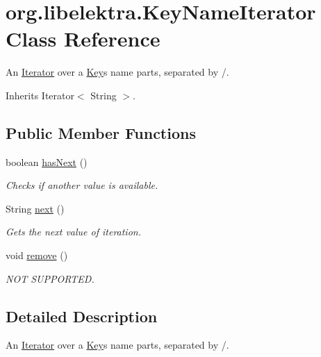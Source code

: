 \hypertarget{classorg_1_1libelektra_1_1KeyNameIterator}{}\section{org.\+libelektra.\+Key\+Name\+Iterator Class Reference}
\label{classorg_1_1libelektra_1_1KeyNameIterator}


An \mbox{\hyperlink{}{Iterator}} over a \mbox{\hyperlink{classorg_1_1libelektra_1_1Key}{Key}}\textquotesingle{}s name parts, separated by /.  




Inherits Iterator$<$ String $>$.

\subsection*{Public Member Functions}
\begin{DoxyCompactItemize}
\item 
boolean \mbox{\hyperlink{classorg_1_1libelektra_1_1KeyNameIterator_aef0fa42475eb9bbc3477493826566889}{has\+Next}} ()
\begin{DoxyCompactList}\small\item\em Checks if another value is available. \end{DoxyCompactList}\item 
String \mbox{\hyperlink{classorg_1_1libelektra_1_1KeyNameIterator_af97f8c817570172eb67e121d9cbf68a2}{next}} ()
\begin{DoxyCompactList}\small\item\em Gets the next value of iteration. \end{DoxyCompactList}\item 
void \mbox{\hyperlink{classorg_1_1libelektra_1_1KeyNameIterator_aed2ee18e452c6e5efb893444dcccfda3}{remove}} ()
\begin{DoxyCompactList}\small\item\em N\+OT S\+U\+P\+P\+O\+R\+T\+ED. \end{DoxyCompactList}\end{DoxyCompactItemize}


\subsection{Detailed Description}
An \mbox{\hyperlink{}{Iterator}} over a \mbox{\hyperlink{classorg_1_1libelektra_1_1Key}{Key}}\textquotesingle{}s name parts, separated by /. 

